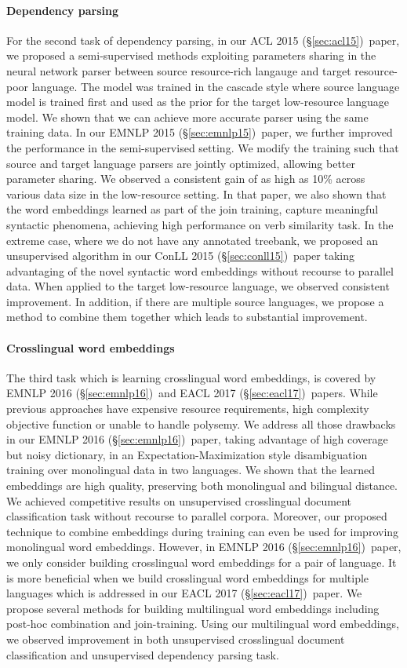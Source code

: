 \documentclass[12pt,twoside,final,hidelinks]{ltthesis}
\theoremstyle{definition}
\newcommand\conllv{ConLL 2015 (\S\ref{sec:conll15})}
\newcommand\aclv{ACL 2015 (\S\ref{sec:acl15})}
\newcommand\emnlpv{EMNLP 2015 (\S\ref{sec:emnlp15})}
\newcommand\emnlpvi{EMNLP 2016 (\S\ref{sec:emnlp16})}
\newcommand\eaclvii{EACL 2017 (\S\ref{sec:eacl17})}
\begin{document}
\paragraph{Dependency parsing} For the second task of dependency parsing, in our \aclv\ paper, we proposed a semi-supervised methods exploiting parameters sharing in the 
neural network parser between source resource-rich langauge and target resource-poor language. The model was trained in the cascade style 
where source language model is trained first and used as the prior for the target low-resource language model. We shown that we can achieve 
more accurate parser using the same training data. In our \emnlpv\ paper, we further improved the performance in the semi-supervised setting. We modify 
the training such that source and target language parsers are jointly optimized, allowing better parameter sharing. We observed a consistent gain
of as high as 10\% across various data size in the low-resource setting. In that paper, we also shown that the word embeddings learned as part 
of the join training, capture meaningful syntactic phenomena, achieving high performance on verb similarity task. In the extreme case, where 
we do not have any annotated treebank, we proposed an unsupervised algorithm in our \conllv\ paper taking advantaging of the novel syntactic word 
embeddings without recourse to parallel data. When applied to the target low-resource language, we observed consistent improvement. In addition, 
if there are multiple source languages, we propose a method to combine them together which leads to substantial improvement. 

\paragraph{Crosslingual word embeddings}The third task which is learning crosslingual word embeddings, is covered by \emnlpvi\ and \eaclvii\ papers. While previous approaches have expensive resource requirements, 
high complexity objective function or unable to handle polysemy. We address all those drawbacks in our \emnlpvi\ paper, taking advantage of high 
coverage but noisy dictionary, in an Expectation-Maximization style disambiguation training over monolingual data in two languages. We shown that the 
learned embeddings are high quality, preserving both monolingual and bilingual distance. We achieved competitive results on unsupervised crosslingual 
document classification task without recourse to parallel corpora. Moreover, our proposed technique to combine embeddings during training can even be used for 
improving monolingual word embeddings. However, in \emnlpvi\ paper, we only consider building crosslingual word embeddings for a pair of language. 
It is more beneficial when we build crosslingual word embeddings for multiple languages which is addressed in our \eaclvii\ paper. We propose
several methods for building multilingual word embeddings including post-hoc combination and join-training. Using our multilingual word embeddings, we observed improvement in both unsupervised crosslingual document classification and unsupervised dependency parsing task. 
\end{document}
